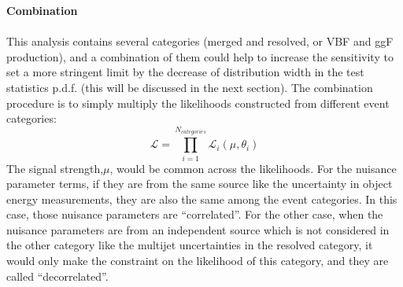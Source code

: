 \noindent
{\bf Combination}
\\
\\This analysis contains several categories (merged and resolved, or VBF and ggF production), and a combination of them could help to increase the sensitivity to set a more stringent limit by the decrease of distribution width in the test statistics p.d.f. (this will be discussed in the next section). The combination procedure is to simply multiply the likelihoods constructed from different event categories\cite{asymptotics}:
\begin{equation}
\mathcal{L}=\displaystyle\prod_{i=1}^{N_{categories}} \mathcal{L}_{i}(\mu, \theta_i)
\end{equation}
The signal strength,$\mu$, would be common across the likelihoods. For the nuisance parameter terms, if they are from the same source like the uncertainty in object energy measurements, they are also the same among the event categories. In this case, those nuisance parameters are ``correlated''. For the other case, when the nuisance parameters are from an independent source which is not considered in the other category like the multijet uncertainties in the resolved category, it would only make the constraint on the likelihood of this category, and they are called ``decorrelated''.  
